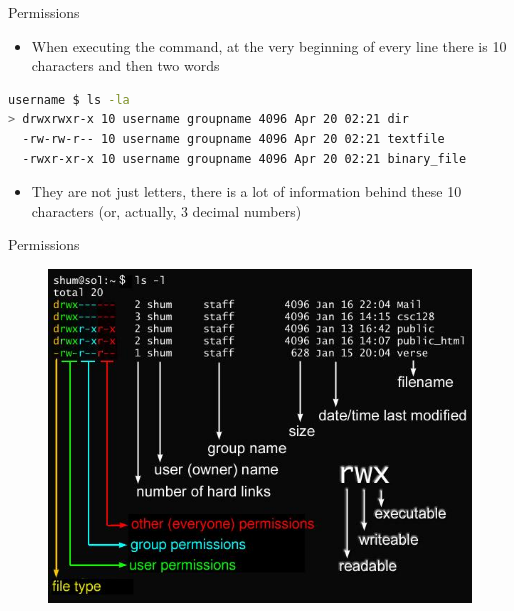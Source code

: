 \documentclass[usenames,dvipsnames,10pt,aspectratio=169]{beamer}
\begin{document}
\begin{frame}[fragile]{Permissions}
    \begin{itemize}
        \item When executing the  command, at the very beginning of every line there is 10 characters and then two words
    \end{itemize}
    \begin{lstlisting}[language=bash, style=shellstyle]
username $ ls -la
> drwxrwxr-x 10 username groupname 4096 Apr 20 02:21 dir
  -rw-rw-r-- 10 username groupname 4096 Apr 20 02:21 textfile
  -rwxr-xr-x 10 username groupname 4096 Apr 20 02:21 binary_file
        \end{lstlisting}
    \begin{itemize}    
        \item They are not just letters, there is a lot of information behind these 10 characters (or, actually, 3 decimal numbers)
    \end{itemize}
\end{frame}

\begin{frame}{Permissions}
    \begin{figure}
        \centering
        \includegraphics[height=0.8\paperheight]{graphics/permissions1.jpg}
\end{figure}
\end{frame}

\end{document}
